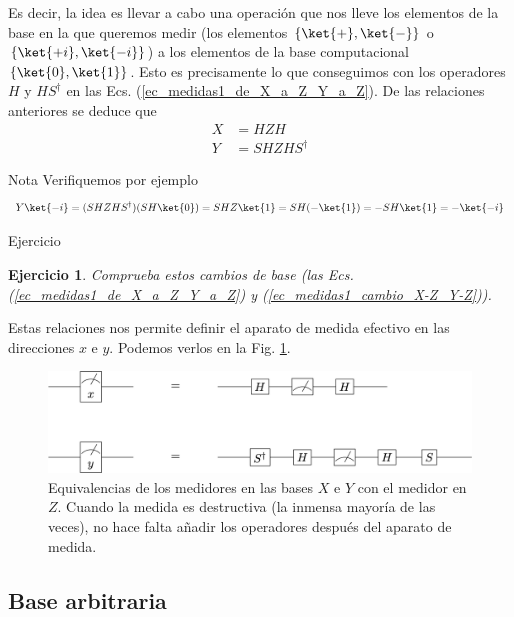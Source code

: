 \documentclass[a4paper,11pt]{book} %
\newtheorem{ejercicio_contador}{Ejercicio}
\newcommand{\Ejercicio}[1]{
		\begin{mybox_gray}{Ejercicio} 
			\begin{ejercicio_contador}
				 #1 
			\end{ejercicio_contador} 
		\end{mybox_gray}
	}
\numberwithin{equation}{chapter}
\begin{document}
Es decir, la idea es llevar a cabo una operación que nos lleve los elementos de la base en la que queremos medir (los elementos $\{\ket{+},\ket{-} \}$ o  $\{\ket{+i},\ket{-i} \}$) a los elementos de la base computacional $\{\ket{0},\ket{1} \}$. Esto es precisamente lo que conseguimos con los operadores $H$ y $H S^\dagger$ en las Ecs. (\ref{ec_medidas1_de_X_a_Z_Y_a_Z}).
De las relaciones anteriores se deduce que
\begin{equation} \label{ec_medidas1_cambio_X-Z_Y-Z}
\begin{split}
X & = H Z H  \\
Y & = S  H  Z   H S^\dagger 
\end{split}
\end{equation}


	\begin{mybox_blue}{Nota}
	Verifiquemos por ejemplo
	\begin{equation}
	Y \ket{-i} = (SHZHS^\dagger )(SH\ket{0}) = SH Z\ket{1} =  SH(-\ket{1})= - SH\ket{1} = -\ket{-i}
	\end{equation}
	\end{mybox_blue}

	\Ejercicio{
	Comprueba estos cambios de base (las Ecs. (\ref{ec_medidas1_de_X_a_Z_Y_a_Z}) y (\ref{ec_medidas1_cambio_X-Z_Y-Z})).
	}
	
Estas relaciones nos permite definir el aparato de medida efectivo en las direcciones $x$ e $y$. Podemos verlos en la Fig. \ref{Fig_medidas1_meter_XYbasis}. 
    
	\begin{figure}[H]
	\centering 
	\includegraphics[width=0.8\linewidth]{Figuras/Fig_medidas1_meter_XYbasis.png}
	\caption{Equivalencias de los medidores en las bases $X$ e $Y$ con el medidor en $Z$. Cuando la medida es destructiva (la inmensa mayoría de las veces), no hace falta añadir los operadores después del aparato de medida.}
	\label{Fig_medidas1_meter_XYbasis}
	\end{figure}

     
        \subsection{Base arbitraria}
\end{document}

